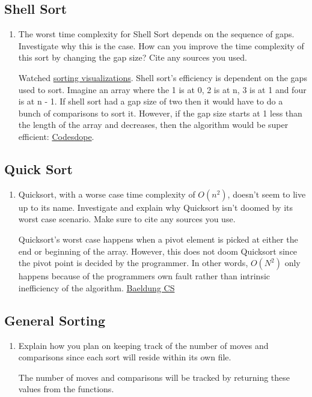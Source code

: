 \documentclass[12pt]{article}
\newenvironment{QandA}{\begin{enumerate}[label=\bfseries\alph*.]\bfseries}
                      {\end{enumerate}}
\newenvironment{answered}{\par\normalfont}{}
\begin{document}
\subsection{Shell Sort}
\begin{QandA}

	\item The worst time complexity for Shell Sort depends on the sequence of gaps. Investigate why this is the case. How can you improve the time complexity of this sort by changing the gap size? Cite any sources you used.
		\begin{answered}
			Watched \href{https://www.youtube.com/watch?v=NYWEM7H3iYc\&t=269s}{sorting visualizations}. Shell sort's efficiency is dependent on the gaps used to sort. Imagine an array where the 1 is at 0, 2 is at n, 3 is at 1 and four is at n - 1. If shell sort had a gap size of two then it would have to do a bunch of comparisons to sort it. However, if the gap size starts at 1 less than the length of the array and decreases, then the algorithm would be super efficient: \href{https://www.codesdope.com/blog/article/shell-sort/}{Codesdope}.
		\end{answered}

\end{QandA}

\subsection{Quick Sort}
\begin{QandA}
	\item Quicksort, with a worse case time complexity of $O(n^2)$, doesn’t seem to live up to its name. Investigate and explain why Quicksort isn’t doomed by its worst case scenario. Make sure to cite any sources you use.
		\begin{answered}
			Quicksort's worst case happens when a pivot element is picked at either the end or beginning of the array. However, this does not doom Quicksort since the pivot point is decided by the programmer. In other words, $O(N^2)$ only happens because of the programmers own fault rather than intrinsic inefficiency of the algorithm. \href{https://www.baeldung.com/cs/quicksort-time-complexity-worst-case}{Baeldung CS}
		\end{answered}


\end{QandA}

\subsection{General Sorting}
\begin{QandA}
	\item Explain how you plan on keeping track of the number of moves and comparisons since each sort will reside within its own file.
		\begin{answered}
			The number of moves and comparisons will be tracked by returning these values from the functions.
		\end{answered}


\end{QandA}
\end{document}
